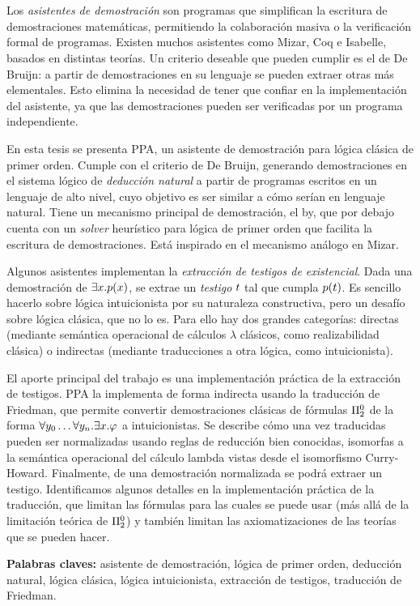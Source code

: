 \chapter*{\runtitulo}

\noindent Los \textit{asistentes de demostración} son programas que simplifican
la escritura de demostraciones matemáticas, permitiendo la colaboración masiva o
la verificación formal de programas. Existen muchos asistentes como Mizar, Coq e
Isabelle, basados en distintas teorías. Un criterio deseable que pueden cumplir
es el de De Bruijn: a partir de demostraciones en su lenguaje se pueden extraer
otras más elementales. Esto elimina la necesidad de tener que confiar en la implementación del asistente, ya que las demostraciones pueden ser verificadas por un programa independiente.

En esta tesis se presenta PPA, un asistente de demostración para lógica clásica
de primer orden. Cumple con el criterio de De Bruijn, generando demostraciones
en el sistema lógico de \textit{deducción natural} a partir de programas
escritos en un lenguaje de alto nivel, cuyo objetivo es ser similar a cómo
serían en lenguaje natural. Tiene un mecanismo principal de demostración, el by,
que por debajo cuenta con un \textit{solver} heurístico para lógica de primer
orden que facilita la escritura de demostraciones. Está inspirado en el
mecanismo análogo en Mizar.

Algunos asistentes implementan la \textit{extracción de testigos de
existencial}. Dada una demostración de $\exists x . p(x)$, se extrae
un \textit{testigo} $t$ tal que cumpla $p(t)$. Es sencillo hacerlo sobre lógica intuicionista por su naturaleza constructiva, pero un desafío sobre lógica clásica, que no lo es. Para ello hay dos grandes categorías: directas (mediante semántica operacional de cálculos $\lambda$ clásicos, como realizabilidad clásica) o indirectas (mediante traducciones a otra lógica, como intuicionista).

El aporte principal del trabajo es una implementación práctica de la extracción
de testigos. PPA la implementa de forma indirecta usando la traducción de
Friedman, que permite convertir  demostraciones clásicas de fórmulas
$\Pi^0_{2}$ de la forma $\forall y_0 \dots \forall y_n . \exists
x . \varphi$ a intuicionistas. Se describe cómo una vez traducidas pueden
ser normalizadas usando reglas de reducción bien conocidas, isomorfas a la
semántica operacional del cálculo lambda vistas desde el isomorfismo
Curry-Howard. Finalmente, de una demostración normalizada se podrá extraer un
testigo. Identificamos algunos detalles en la implementación práctica de la
traducción, que limitan las fórmulas para las cuales se puede usar (más allá de
la limitación teórica de $\Pi^0_{2}$) y también limitan las axiomatizaciones
de las teorías que se pueden hacer.

\bigskip

\noindent\textbf{Palabras claves:} asistente de demostración, lógica de primer orden, deducción natural, lógica clásica, lógica intuicionista, extracción de testigos, traducción de Friedman.
